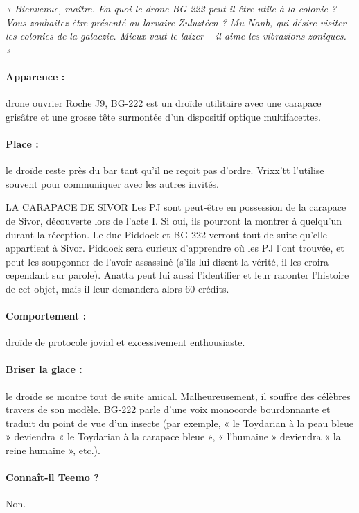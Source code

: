 \documentclass[a4paper,10pt,twoside,twocolumn,openany]{book}
\begin{document}
\subtitle{BG-222}
\emph{« Bienvenue, maître. En quoi le drone BG-222 peut-il
être utile à la colonie ? Vous zouhaitez être présenté
au larvaire Zuluztéen ? Mu Nanb, qui désire visiter les
colonies de la galaczie. Mieux vaut le laizer – il aime
les vibrazions zoniques. »}
\paragraph{Apparence :} drone ouvrier Roche J9, BG-222 est un
droïde utilitaire avec une carapace grisâtre et une grosse
tête surmontée d’un dispositif optique multifacettes.
\paragraph{Place :} le droïde reste près du bar tant qu’il ne reçoit pas
d’ordre. Vrixx’tt l’utilise souvent pour communiquer avec
les autres invités.

\begin{commentbox}{LA CARAPACE DE SIVOR}
  Les PJ sont peut-être en possession de la carapace de Sivor, découverte lors de l’acte I. Si oui,
ils pourront la montrer à quelqu’un durant la réception. Le duc Piddock et BG-222 verront tout
de suite qu’elle appartient à Sivor. Piddock sera
curieux d’apprendre où les PJ l’ont trouvée, et
peut les soupçonner de l’avoir assassiné (s’ils lui
disent la vérité, il les croira cependant sur parole).
Anatta peut lui aussi l’identifier et leur raconter
l’histoire de cet objet, mais il leur demandera
alors 60 crédits.
\end{commentbox}



\paragraph{Comportement :} droïde de protocole jovial et excessivement enthousiaste.
\paragraph{Briser la glace :} le droïde se montre tout de suite amical. Malheureusement, il souffre des célèbres travers de
son modèle. BG-222 parle d’une voix monocorde bourdonnante et traduit du point de vue d’un insecte (par
exemple, « le Toydarian à la peau bleue » deviendra « le
Toydarian à la carapace bleue », « l’humaine » deviendra
« la reine humaine », etc.).

\paragraph{Connaît-il Teemo ?} Non.
\end{document}
